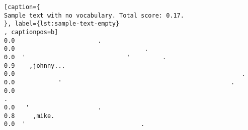 
\begin{lstlisting}[caption={
Sample text with no vocabulary. Total score: 0.17.
}, label={lst:sample-text-empty}
, captionpos=b]
0.0	                      .
0.0	                                   .
0.0	 '                            '         .
0.9	   ,johnny...
0.0	                                                              .
0.0	           '                                               .
0.0	                                                                  .
0.0	  '                   .
0.8	    ,mike.
0.0	 '                                .
\end{lstlisting}


